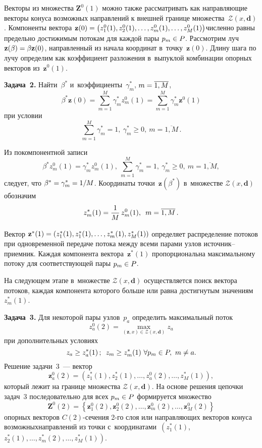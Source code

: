 \begin{multicols}{2}
Векторы из множества $\mathbf{Z}^0(1)$ можно также рас\-смат\-ри\-вать как 
направляющие векторы конуса возмож\-ных направлений к внешней 
границе множества~$\mathcal{Z}(x,\mathbf{ d})$.
Компоненты вектора $\mathbf{z}(0) \hm= \left(
{z}_1^0(1), {z}_2^0(1), \ldots, {z}_m^0(1), \ldots, 
{z}_M^0(1)\right)$\linebreak численно равны предельно достижимым потокам для каждой 
пары $p_m \hm\in P$. Рассмотрим  луч $\mathbf{z}(\beta)
\hm = \beta \mathbf{z}(0)$, на\-прав\-лен\-ный из начала координат 
в~точку~$\mathbf{z}(0)$. Длину шага по лучу определим как коэффициент 
разложения в~выпуклой комбинации опорных векторов из~$\mathbf{z}^0(1)$.

\smallskip

\noindent
\textbf{Задача~2.} Найти~$\beta^*$ и~коэффициенты~$\gamma_m^*$,  
$m \hm= \overline {1, M}$,
$$
\beta^* \mathbf{z}(0) = \sum\limits_{m=1}^M \gamma_m^* {z}_m^0(1) = 
\sum\limits_{m=1}^M \gamma_m^* \mathbf{z}^0(1) 
$$
при условии 
$$
\sum\limits_{m=1}^M \gamma_m^* = 1, \  \gamma_m^* \ge 0, \ 
 m = \overline {1, M}\,. 
 $$

Из покомпонентной записи
$$
\beta^* {z}_m^0(1) = \gamma_m^* {z}_m^0(1), \ 
 \sum\limits_{m=1}^M \gamma_m^* = 1, \  
 \gamma_m^* \ge 0, \  m = \overline {1, M},
 $$
следует, что $\beta^* \hm= \gamma_m^*  \hm= 1/M$. 
Координаты точки~$\mathbf{z}(\beta^*)$ 
в~множестве $ \mathcal{Z}(x,\mathbf{ d})$ обозначим
$$
z_m^*(1) = \displaystyle\frac{\displaystyle 1\mathstrut}{\displaystyle M\mathstrut}\, z_m^0(1),\enskip  m = \overline {1, M}\,. 
$$

Вектор $\mathbf{z}^*(1) \hm= \left(z_1^*(1), z_1^*(1), \ldots, z_m^*(1), 
z_M^*(1)\right)$ определяет распределение потоков при одновременной 
передаче потока между всеми парами узлов ис\-точ\-ник--при\-ем\-ник. 
Каждая компонента вектора~$\mathbf{z}^*(1)$  пропорциональна максимальному 
потоку для соответствующей пары $p_m \hm\in P$.

На следующем этапе в~множестве $\mathcal{Z}(x, \mathbf{d})$ 
осуществляется поиск вектора потоков, каждая компонента которого 
больше или равна достигнутым значениям~${z}_m^*(1)$.

\smallskip

\noindent
\textbf{Задача~3.} Для некоторой пары узлов~$p_a$ определить 
максимальный поток
$$ 
z_a^0 (2) = \max\limits_{(\mathbf{z}, x)  \in \mathcal{Z}(x, \mathbf{d})}  z_a  
$$
при дополнительных условиях 
$$ z_a \ge z_a^*(1)\,;\enskip z_m \ge z_m^*(1)\  \forall p_m \in P,  \ 
m\not = a. $$
Решение задачи~3~--- вектор 
$$
\mathbf{z}_a^0 (2) = \left(z_1^*(1), z_2^*(1), \ldots, z_a^0 (2), 
\ldots, z_M^*(1)\right), 
$$
который лежит на границе множества $\mathcal{Z}(x, \mathbf{d})$. 
На основе решения цепочки задач~3 последовательно для всех $p_m \hm\in P$ 
формируется множество
$$
\mathbf{Z}^0(2)= \left\{\mathbf{z}_1^0(2), \mathbf{z}_2^0(2), 
\ldots, \mathbf{z}_m^0(2), \ldots, \mathbf{z}_M^0(2)\right\}
$$ 
опорных векторов $C(2)$-се\-че\-ния 2-го слоя или направляющих 
векторов конуса возможных\linebreak направлений из точки 
с~координатами~$\left(z_1^*(1)\right.$,\linebreak  $\left.z_2^*(1), \ldots, z_m^*(2), \ldots, z_M^*(1)\right)$.


\end{multicols}
